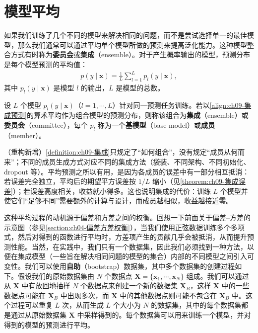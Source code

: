 \documentclass[../../main.tex]{subfiles}
\begin{document}
\section{模型平均}\label{section:ch09-模型平均}

如果我们训练了几个不同的模型来解决相同的问题，而不是尝试选择单一的最佳模型，那么我们通常可以通过平均单个模型所做的预测来提高泛化能力。这种模型整合方式有时称为\textbf{委员会}或\textbf{集成}（ensemble）。对于产生概率输出的模型，预测分布是每个模型预测的平均值：
\begin{align}
p(y\mid\boldsymbol{x})=\frac{1}{L}\sum_{l=1}^{L}p_{l}(y\mid\boldsymbol{x}),
\label{align:ch09-集成预测}
\end{align}
其中 $p_{l}(y\mid\boldsymbol{x})$ 是模型 $l$ 的输出，$L$ 是模型的总数。

\begin{definition}[集成与委员会]\label{definition:ch09-集成}
设 $L$ 个模型 $p_{l}(y\mid\boldsymbol{x})$（$l=1,\cdots,L$）针对同一预测任务训练。若以\eqref{align:ch09-集成预测}的算术平均作为组合模型的预测分布，则称该组合为\textbf{集成}（ensemble）或\textbf{委员会}（committee），每个 $p_{l}$ 称为一个\textbf{基模型}（base model）或\textbf{成员}（member）。
\end{definition}

\begin{remark}（重构新增）\cref{definition:ch09-集成}只规定了“如何组合”，没有规定“成员从何而来”；不同的成员生成方式对应不同的集成方法（袋装、不同架构、不同初始化、dropout 等）。平均预测之所以有用，是因为各成员的误差中有一部分相互抵消：若误差完全独立，平均后的期望平方误差按 $1/L$ 缩小（见\cref{theorem:ch09-集成误差}）；若误差高度相关，收益就小得多。这也说明集成的代价：训练 $L$ 个模型并使它们“足够不同”需要额外的计算与设计，而成员越相似，收益越接近零。
\end{remark}

这种平均过程的动机源于偏差和方差之间的权衡。回想一下前面关于偏差--方差的示意图（参见\cref{section:ch04-偏差方差权衡}），当我们使用正弦数据训练多个多项式，然后对得到的函数进行平均时，方差项产生的贡献几乎会被抵消，从而提升预测性能。当然，在实践中，我们只有一个数据集，因此我们必须找到一种方法，以便在集成模型（一些旨在解决相同问题的模型的集合）内部的不同模型之间引入可变性。我们可以使用\textbf{自助}（bootstrap）数据集，其中多个数据集的创建过程如下。假设我们的原始数据集由 $N$ 个数据点 $\boldsymbol{X}=\{\boldsymbol{x}_{1},\cdots,\boldsymbol{x}_{N}\}$ 组成。我们可以通过从 $\boldsymbol{X}$ 中有放回地抽样 $N$ 个数据点来创建一个新的数据集 $\boldsymbol{X}_{B}$，这样 $\boldsymbol{X}$ 中的一些数据点可能在 $\boldsymbol{X}_{B}$ 中出现多次，而 $\boldsymbol{X}$ 中的其他数据点则可能不包含在 $\boldsymbol{X}_{B}$ 中。这个过程可以重复 $L$ 次，从而生成 $L$ 个大小为 $N$ 的数据集，其中的每个数据集都是通过从原始数据集 $\boldsymbol{X}$ 中采样得到的。每个数据集可以用来训练一个模型，并对得到的模型的预测进行平均。
\end{document}
